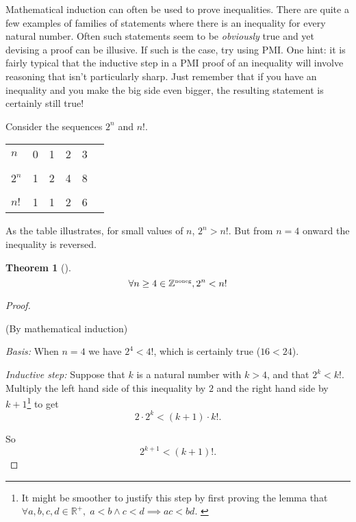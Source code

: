 \documentclass[10pt,]{book}
\theoremstyle{plain}
\newtheorem{theorem}{Theorem}[section]
\theoremstyle{definition}
\theoremstyle{definition}
\numberwithin{equation}{section}
\newcommand{\hrulethin}  {\noalign{\hrule height 0.04em}}
\renewcommand{\Naturals}{{\mathbb Z}^{\mbox{\tiny noneg}} }
\newcommand{\Naturals}{{\mathbb N}}
\newcommand{\lt}{ < }
\begin{document}
    Mathematical induction
    can often be used to prove inequalities. There are quite a few examples
    of families of statements where there is an inequality for every natural
    number. Often such statements seem to be \emph{obviously} true and yet
    devising a proof can be illusive. If such is the case, try using PMI.
    One hint: it is fairly typical that the inductive step in a PMI proof
    of an inequality will involve reasoning that isn't particularly sharp.
    Just remember that if you have an inequality and you make the big
    side even bigger, the resulting statement is certainly still true!
\par

    Consider the sequences \(2^n\) and \(n!\).
\begin{tabular}{llllll}
\(n\)&0&1&2&3&\tabularnewline[0pt]
&&&&&\tabularnewline\hrulethin
\(2^n\)&1&2&4&8&\tabularnewline[0pt]
&&&&&\tabularnewline\hrulethin
\(n!\)&1&1&2&6&
\end{tabular}
\par

    As the table illustrates, for small values of \(n\), \(2^n > n!\). But from \(n=4\)
    onward the inequality is reversed.
\begin{theorem}[{}]\label{theorem-24}
\begin{equation*}
        \forall n \geq 4 \in \Naturals, 2^n \lt  n!
      \end{equation*}\end{theorem}
\begin{proof}\hypertarget{proof-36}{}

      (By mathematical induction)
\par

      \emph{Basis:} When \(n=4\) we have \(2^4 \lt  4!\), which is certainly
      true (\(16 \lt  24\)).
\par

      \emph{Inductive step:} Suppose that \(k\) is a natural number
      with \(k > 4\), and that \(2^k \lt  k!\). Multiply the left hand side of this
      inequality by \(2\) and the right hand side by \(k+1\)\footnote{It might be 
      smoother to justify this step by first proving the lemma that 
      \(\forall a,b,c,d \in {\mathbb R}^+, \; a\lt b \land c\lt d \implies ac \lt  bd\). \label{fn-36}}
      to get
      \begin{equation*}
        2\cdot 2^{k} \lt  (k+1) \cdot k!.
      \end{equation*}
\par

      So
      \begin{equation*}
        2^{k+1} \lt  (k+1)!.
      \end{equation*}
\end{proof}
\par
\end{document}
